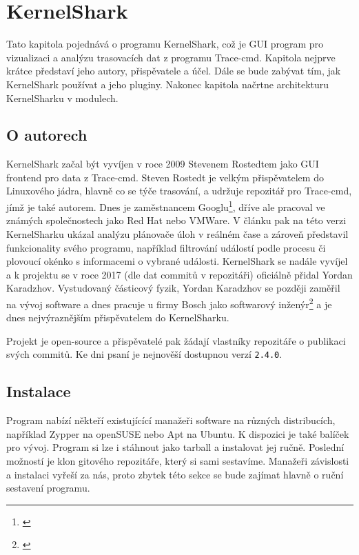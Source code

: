 \chapter{KernelShark}
\label{kap-kernel-shark}

Tato kapitola pojednává o programu KernelShark, což je GUI program pro vizualizaci a analýzu trasovacích dat z programu Trace-cmd. Kapitola nejprve krátce představí jeho autory, přispěvatele a účel. Dále se bude zabývat tím, jak KernelShark používat a jeho pluginy. Nakonec kapitola načrtne architekturu KernelSharku v modulech.

\section{O autorech}

KernelShark začal být vyvíjen v roce 2009 Stevenem Rostedtem jako GUI frontend pro data z Trace-cmd. Steven Rostedt je velkým přispěvatelem do Linuxového jádra, hlavně co se týče trasování, a udržuje repozitář pro Trace-cmd, jímž je také autorem. Dnes je zaměstnancem Googlu\footnote{ \cite{SR-LinkedIn}}, dříve ale pracoval ve známých společnostech jako Red Hat nebo VMWare. V článku \cite{LWM-Kshark} pak na této verzi KernelSharku ukázal analýzu plánovače úloh v reálném čase a zároveň představil funkcionality svého programu, například filtrování událostí podle procesu či plovoucí okénko s informacemi o vybrané události. KernelShark se nadále vyvíjel a k projektu se v roce 2017 (dle dat commitů v repozitáři) oficiálně přidal Yordan Karadzhov. Vystudovaný částicový fyzik, Yordan Karadzhov se později zaměřil na vývoj software a dnes pracuje u firmy Bosch jako softwarový inženýr\footnote{ \cite{YK-LinkedIn}} a je dnes nejvýraznějším přispěvatelem do KernelSharku.

Projekt je open-source a přispěvatelé pak žádají vlastníky repozitáře o publikaci svých commitů. Ke dni psaní je nejnověší dostupnou verzí \texttt{2.4.0}.

\section{Instalace}

Program nabízí někteří existujícící manažeři software na různých distribucích, například Zypper na openSUSE nebo Apt na Ubuntu. K dispozici je také balíček pro vývoj. Program si lze i stáhnout jako tarball a instalovat jej ručně. Poslední možností je klon gitového repozitáře, který si sami sestavíme. Manažeři závislosti a instalaci vyřeší za nás, proto zbytek této sekce se bude zajímat hlavně o ruční sestavení programu.

